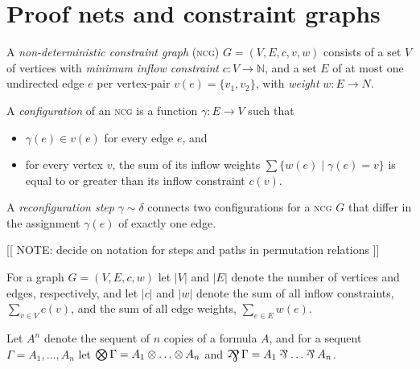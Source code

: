 \section{Proof nets and constraint graphs}


\newcommand\itn[1]{\llbracket#1\rrbracket}
\newcommand\coitn[1]{\llparenthesis#1\rrparenthesis}

\begin{definition}
A \emph{non-deterministic constraint graph} (\textsc{ncg}) $G=(V,E,c,v,w)$ consists of a set $V$ of vertices with \emph{minimum inflow constraint} $c\colon V\to\mathbb N$, and a set $E$ of at most one undirected edge $e$ per vertex-pair $v(e)=\{v_1,v_2\}$, with \emph{weight} $w\colon E\to N$.

A \emph{configuration} of an \textsc{ncg} is a function $\gamma\colon E\to V$ such that
\begin{itemize}
	\item
$\gamma(e)\in v(e)$ for every edge $e$, and
	\item
for every vertex $v$, the sum of its inflow weights $\sum\{w(e)\mid \gamma(e)=v\}$ is equal to or greater than its inflow constraint $c(v)$.
\end{itemize}

A \emph{reconfiguration step} $\gamma\sim\delta$ connects two configurations for a \textsc{ncg} $G$ that differ in the assignment $\gamma(e)$ of exactly one edge.

\end{definition}

[[ NOTE: decide on notation for steps and paths in permutation relations ]]

For a graph $G=(V,E,c,w)$ let $|V|$ and $|E|$ denote the number of vertices and edges, respectively, and let $|c|$ and $|w|$ denote the sum of all inflow constraints, $\sum_{v\in V}c(v)$, and the sum of all edge weights, $\sum_{e\in E}w(e)$.


Let $A^n$ denote the sequent of $n$ copies of a formula $A$, and for a sequent $\Gamma=A_1,\dotsc,A_n$ let $\bigotimes\Gamma=A_1\otimes\dotso\otimes A_n$ and $\bigparr\Gamma=A_1\parr\dotso\parr A_n$.



